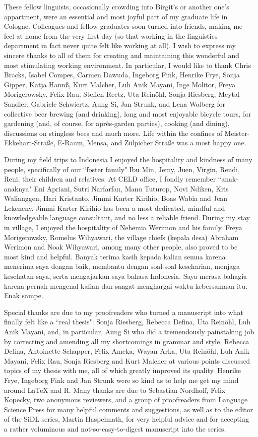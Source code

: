 These fellow linguists, occasionally crowding into Birgit's or another one's appartment, were an essential and most joyful part of my graduate life in Cologne. Colleagues and fellow graduates soon turned into friends, making me feel at home from the very first day (so that working in the linguistics department in fact never quite felt like working at all). I wish to express my sincere thanks to all of them for creating and maintaining this wonderful and most stimulating working environment. In particular, I would like to thank Chris Bracks, Isabel Compes, Carmen Dawuda, Ingeborg Fink, Henrike Frye, Sonja Gipper, Katja Hannß, Kurt Malcher, Luh Anik Mayani, Inge Molitor, Freya Morigerowsky, Felix Rau, Steffen Reetz, Uta Reinöhl, Sonja Riesberg, Meytal Sandler, Gabriele Schwiertz, Aung Si, Jan Strunk, and Lena Wolberg for collective beer brewing (and drinking), long and most enjoyable bicycle tours, for gardening (and, of course, for après-garden parties), cooking (and dining), discussions on stingless bees and much more. Life within the confines of Meister-Ekkehart-Straße, E-Raum, Mensa, and Zülpicher Straße was a most happy one.

During my field trips to Indonesia I enjoyed the hospitality and kindness of many people, specifically of our ``foster family" Ibu Min,  Jemy, Juen, Virgin, Rendi, Reni, their children and relatives. At CELD office, I fondly remember ``anak-anaknya" Eni Apriani, Sutri Narfarfan, Manu Tuturop, Novi Ndiken, Kris Walianggen, Hari Kristanto, Jimmi Karter Kirihio, Boas Wabia and Jean Lekeneny. Jimmi Karter Kirihio has been a most dedicated, mindful and knowledgeable language consultant, and no less a reliable friend. During my stay in  village, I enjoyed the hospitality of Nehemia Werimon and his family. Freya Morigerowsky,  Romelus Wihyawari, the village chiefs (kepala desa) Abraham Werimon and Noak Wihyawari, among many other people, also proved to be most kind and helpful. Banyak terima kasih kepada kalian semua karena menerima saya dengan baik, membantu dengan soal-soal keseharian, menjaga kesehatan saya, serta mengajarkan saya bahasa Indonesia. Saya merasa bahagia karena pernah mengenal kalian dan sangat menghargai waktu kebersamaan itu. Enak sampe.

Special thanks are due to my proofreaders who turned a manuscript into what finally felt like a ``real thesis": Sonja Riesberg, Rebecca Defina, Uta Reinöhl, Luh Anik Mayani, and, in particular, Aung Si who did a tremendously painstaking job by correcting and amending all my shortcomings in grammar and style. Rebecca Defina, Antoinette Schapper, Felix Ameka, Wayan Arka, Uta Reinöhl, Luh Anik Mayani, Felix Rau, Sonja Riesberg and Kurt Malcher at various points discussed topics of my thesis with me, all of which greatly improved its quality. Henrike Frye, Ingeborg Fink and Jan Strunk were so kind as to help me get my mind around LaTeX and R. Many thanks are due to Sebastian Nordhoff, Felix Kopecky, two anonymous reviewers, and a group of proofreaders from Language Science Press for many helpful comments and suggestions, as well as to the editor of the SiDL series, Martin Haspelmath, for very helpful advice and for accepting a rather voluminous and not-so-easy-to-digest manuscript into the series.

